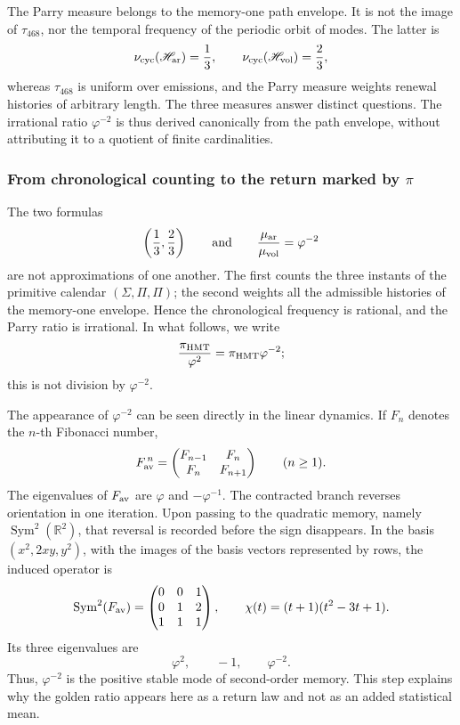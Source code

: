 The Parry measure belongs to the memory-one path envelope. It is not
the image of \(\tau_{468}\), nor the temporal frequency of the periodic orbit
of modes. The latter is
\[
 \nu_{\rm cyc}(\mathscr H_{\rm ar})=\frac13,\qquad
 \nu_{\rm cyc}(\mathscr H_{\rm vol})=\frac23,
\]
whereas \(\tau_{468}\) is uniform over emissions, and the Parry measure
weights renewal histories of arbitrary length. The three measures
answer distinct questions. The irrational ratio
\(\varphi^{-2}\) is thus derived canonically from the path envelope,
without attributing it to a quotient of finite cardinalities.

\subsubsection{From chronological counting to the return marked by \texorpdfstring{\(\pi\)}{π}}
\label{sec:retorno-marcado-pi-phi2}

The two formulas
\[
 \left(\frac13,\frac23\right)
 \qquad\text{and}\qquad
 \frac{\mu_{\rm ar}}{\mu_{\rm vol}}=\varphi^{-2}
\]
are not approximations of one another. The first counts the three instants of the
primitive calendar \((\Sigma,\Pi,\Pi)\); the second weights all the
admissible histories of the memory-one envelope. Hence the chronological
frequency is rational, and the Parry ratio is irrational. In what follows,
we write
\[
 \frac{\pi_{\rm HMT}}{\varphi^2}
 =\pi_{\rm HMT}\varphi^{-2};
\]
this is not division by \(\varphi^{-2}\).

The appearance of \(\varphi^{-2}\) can be seen directly in the linear
dynamics. If \(F_n\) denotes the \(n\)-th Fibonacci number,
\[
 F_{\rm av}^{\,n}
 =
 \begin{pmatrix}
  F_{n-1}&F_n\\
  F_n&F_{n+1}
 \end{pmatrix}
 \qquad(n\geq1).
\]
The eigenvalues of \(F_{\rm av}\) are \(\varphi\) and \(-\varphi^{-1}\). The contracted branch reverses orientation in one iteration. Upon passing to the quadratic memory, namely \(\operatorname{Sym}^2(\mathbb R^2)\), that reversal is recorded before the sign disappears. In the basis \((x^2,2xy,y^2)\), with the images of the basis vectors represented by rows, the induced operator is
\[
 \operatorname{Sym}^2(F_{\rm av})=
 \begin{pmatrix}
  0&0&1\\
  0&1&2\\
  1&1&1
 \end{pmatrix},
 \qquad
 \chi(t)=(t+1)(t^2-3t+1).
\]
Its three eigenvalues are
\[
 \varphi^2,\qquad -1,\qquad \varphi^{-2}.
\]
Thus, \(\varphi^{-2}\) is the positive stable mode of second-order
memory. This step explains why the golden ratio appears here as a return
law and not as an added statistical mean.

